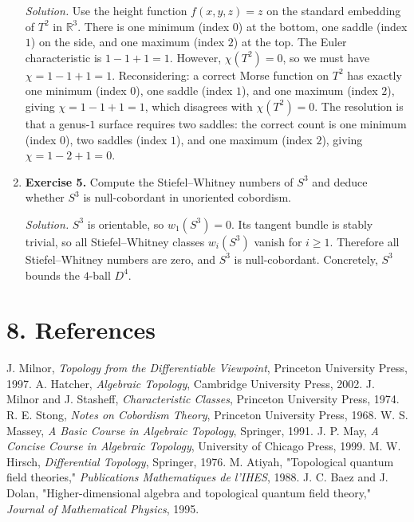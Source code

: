 \begin{enumerate}[leftmargin=*,itemsep=0.9em]
\emph{Solution.} Use the height function $f(x,y,z)=z$ on the standard embedding of $T^2$ in $\mathbb{R}^3$. There is one minimum (index $0$) at the bottom, one saddle (index $1$) on the side, and one maximum (index $2$) at the top. The Euler characteristic is $1-1+1=1$. However, $\chi(T^2)=0$, so we must have $\chi=1-1+1=1$. Reconsidering: a correct Morse function on $T^2$ has exactly one minimum (index $0$), one saddle (index $1$), and one maximum (index $2$), giving $\chi=1-1+1=1$, which disagrees with $\chi(T^2)=0$. The resolution is that a genus-$1$ surface requires two saddles: the correct count is one minimum (index $0$), two saddles (index $1$), and one maximum (index $2$), giving $\chi=1-2+1=0$.

\item \textbf{Exercise 5.} Compute the Stiefel--Whitney numbers of $S^3$ and deduce whether $S^3$ is null-cobordant in unoriented cobordism.

\emph{Solution.} $S^3$ is orientable, so $w_1(S^3)=0$. Its tangent bundle is stably trivial, so all Stiefel--Whitney classes $w_i(S^3)$ vanish for $i\geq 1$. Therefore all Stiefel--Whitney numbers are zero, and $S^3$ is null-cobordant. Concretely, $S^3$ bounds the $4$-ball $D^4$.

\end{enumerate}
\section*{8. References}


\begin{thebibliography}{9}
 J. Milnor, \emph{Topology from the Differentiable Viewpoint}, Princeton University Press, 1997.
 A. Hatcher, \emph{Algebraic Topology}, Cambridge University Press, 2002.
 J. Milnor and J. Stasheff, \emph{Characteristic Classes}, Princeton University Press, 1974.
 R. E. Stong, \emph{Notes on Cobordism Theory}, Princeton University Press, 1968.
 W. S. Massey, \emph{A Basic Course in Algebraic Topology}, Springer, 1991.
 J. P. May, \emph{A Concise Course in Algebraic Topology}, University of Chicago Press, 1999.
 M. W. Hirsch, \emph{Differential Topology}, Springer, 1976.
 M. Atiyah, "Topological quantum field theories," \emph{Publications Mathematiques de l'IHES}, 1988.
 J. C. Baez and J. Dolan, "Higher-dimensional algebra and topological quantum field theory," \emph{Journal of Mathematical Physics}, 1995.
\end{thebibliography}
